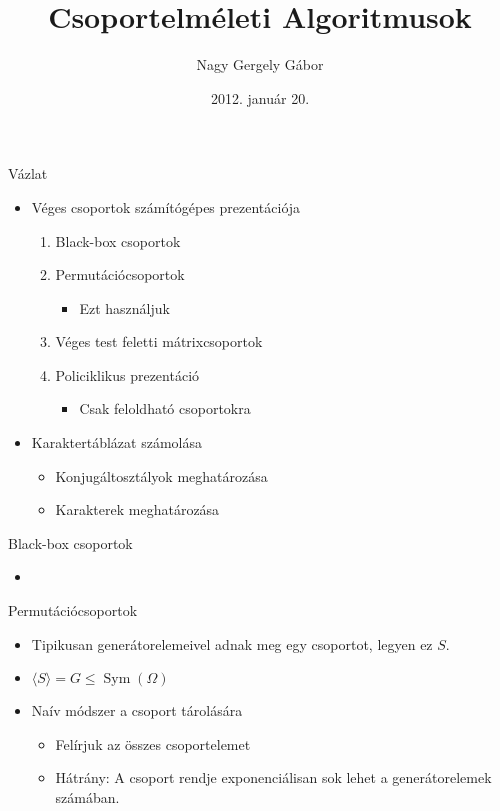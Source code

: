 \documentclass[mathserif]{beamer}
\DeclareMathOperator{\Sym}{Sym}
\begin{document}
\title[Csoportelméleti Algoritmusok]{Csoportelméleti Algoritmusok}
\author{Nagy Gergely Gábor}
\date{2012. január 20.}

\begin{frame}
\titlepage
\end{frame}

\begin{frame}{Vázlat}
\begin{itemize}
\item Véges csoportok számítógépes prezentációja
	\begin{enumerate}
	\item Black-box csoportok
	\item Permutációcsoportok
		\begin{itemize}
		\item Ezt használjuk
		\end{itemize}
	\item Véges test feletti mátrixcsoportok
	\item Policiklikus prezentáció
		\begin{itemize}
		\item Csak feloldható csoportokra
		\end{itemize}
	\end{enumerate}
\item Karaktertáblázat számolása
	\begin{itemize}
	\item Konjugáltosztályok meghatározása
	\item Karakterek meghatározása
	\end{itemize}
\end{itemize}
\end{frame}

\begin{frame}{Black-box csoportok}
\begin{itemize}
\item
\end{itemize}
\end{frame}

\begin{frame}{Permutációcsoportok}
\begin{itemize}
\item Tipikusan generátorelemeivel adnak meg egy csoportot, legyen ez $S$.
\item $\langle S \rangle = G \le \Sym(\Omega)$
\item Naív módszer a csoport tárolására
	\begin{itemize}
	\item Felírjuk az összes csoportelemet
	\item Hátrány: A csoport rendje exponenciálisan sok lehet a generátorelemek számában.
	\end{itemize}
\end{itemize}
\end{frame}
\end{document}
